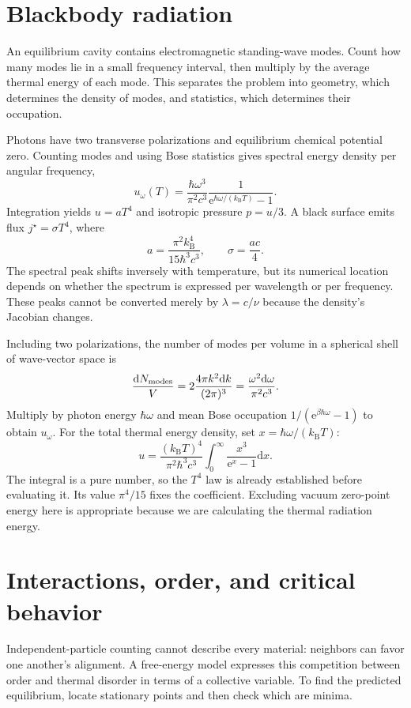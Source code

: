 \documentclass[11pt,oneside]{book}
\newcommand{\dd}{\mathrm{d}}
\newcommand{\ee}{\mathrm{e}}
\newcommand{\kb}{k_{\mathrm B}}
\theoremstyle{reviewstyle}
\begin{document}
\section{Blackbody radiation}
An equilibrium cavity contains electromagnetic standing-wave modes. Count how many modes lie in a small frequency interval, then multiply by the average thermal energy of each mode. This separates the problem into geometry, which determines the density of modes, and statistics, which determines their occupation.

Photons have two transverse polarizations and equilibrium chemical potential zero. Counting modes and using Bose statistics gives spectral energy density per angular frequency,
\begin{equation}
u_\omega(T)=\frac{\hbar\omega^3}{\pi^2c^3}\frac1{\ee^{\hbar\omega/(\kb T)}-1}.
\end{equation}
Integration yields $u=aT^4$ and isotropic pressure $p=u/3$. A black surface emits flux $j^\star=\sigma T^4$, where
\begin{equation}a=\frac{\pi^2\kb^4}{15\hbar^3c^3},\qquad \sigma=\frac{ac}{4}.\end{equation}
The spectral peak shifts inversely with temperature, but its numerical location depends on whether the spectrum is expressed per wavelength or per frequency. These peaks cannot be converted merely by $\lambda=c/\nu$ because the density's Jacobian changes.

Including two polarizations, the number of modes per volume in a spherical shell of wave-vector space is
\begin{equation}
\frac{\dd N_{\rm modes}}V=2\frac{4\pi k^2\dd k}{(2\pi)^3}
=\frac{\omega^2\dd\omega}{\pi^2c^3}.
\end{equation}
Multiply by photon energy $\hbar\omega$ and mean Bose occupation $1/(\ee^{\beta\hbar\omega}-1)$ to obtain $u_\omega$. For the total thermal energy density, set $x=\hbar\omega/(\kb T)$:
\begin{equation}
u=\frac{(\kb T)^4}{\pi^2\hbar^3c^3}
\int_0^\infty\frac{x^3}{\ee^x-1}\dd x.
\end{equation}
The integral is a pure number, so the $T^4$ law is already established before evaluating it. Its value $\pi^4/15$ fixes the coefficient. Excluding vacuum zero-point energy here is appropriate because we are calculating the thermal radiation energy.

\section{Interactions, order, and critical behavior}
Independent-particle counting cannot describe every material: neighbors can favor one another's alignment. A free-energy model expresses this competition between order and thermal disorder in terms of a collective variable. To find the predicted equilibrium, locate stationary points and then check which are minima.
\end{document}
